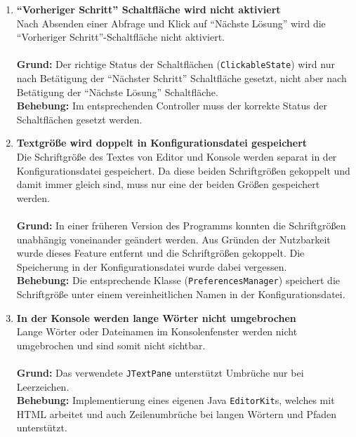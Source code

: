\documentclass[parskip=full,11pt,twoside]{scrartcl}
\begin{document}
\begin{enumerate}[label=\#\arabic*]
  \item \textbf{\enquote{Vorheriger Schritt} Schaltfläche wird nicht aktiviert}\\
        Nach Absenden einer Abfrage und Klick auf \enquote{Nächste Lösung} wird die \enquote{Vorheriger Schritt}-Schaltfläche nicht aktiviert.\\\\
        \textbf{Grund:} Der richtige Status der Schaltflächen (\texttt{ClickableState}) wird nur nach Betätigung der \enquote{Nächster Schritt} Schaltfläche gesetzt, nicht aber nach Betätigung der \enquote{Nächste Lösung} Schaltfläche.\\
        \textbf{Behebung:} Im entsprechenden Controller muss der korrekte Status der Schaltflächen gesetzt werden.

  \item \textbf{Textgröße wird doppelt in Konfigurationsdatei gespeichert}\\
        Die Schriftgröße des Textes von Editor und Konsole werden separat in der Konfigurationsdatei gespeichert. Da diese beiden Schriftgrößen gekoppelt und damit immer gleich sind, muss nur eine der beiden Größen gespeichert werden.\\\\
        \textbf{Grund:} In einer früheren Version des Programms konnten die Schriftgrößen unabhängig voneinander geändert werden. Aus Gründen der Nutzbarkeit wurde dieses Feature entfernt und die Schriftgrößen gekoppelt. Die Speicherung in der Konfigurationsdatei wurde dabei vergessen.\\
        \textbf{Behebung:} Die entsprechende Klasse (\texttt{PreferencesManager}) speichert die Schriftgröße unter einem vereinheitlichen Namen in der Konfigurationsdatei.

  \item \textbf{In der Konsole werden lange Wörter nicht umgebrochen}\\
        Lange Wörter oder Dateinamen im Konsolenfenster werden nicht umgebrochen und sind somit nicht sichtbar.\\\\
        \textbf{Grund:} Das verwendete \texttt{JTextPane} unterstützt Umbrüche nur bei Leerzeichen.\\
        \textbf{Behebung:} Implementierung eines eigenen Java \texttt{EditorKit}s, welches mit HTML arbeitet und auch Zeilenumbrüche bei langen Wörtern und Pfaden unterstützt.


\end{enumerate}
\end{document}
